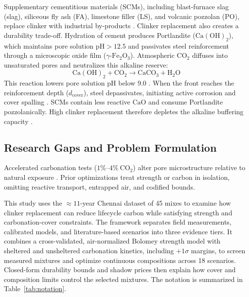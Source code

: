 \documentclass[journal]{IEEEtran}
\begin{document}
Supplementary cementitious materials (SCMs), including blast-furnace slag (slag), siliceous fly ash (FA), limestone filler (LS), and volcanic pozzolan (PO), replace clinker with industrial by-products \cite{scrivener2018, lothenbach2011}. Clinker replacement also creates a durability trade-off. Hydration of cement produces Portlandite ($\mathrm{Ca(OH)}_2$), which maintains pore solution $\mathrm{pH} > 12.5$ and passivates steel reinforcement through a microscopic oxide film ($\gamma\text{-}\mathrm{Fe}_2\mathrm{O}_3$). Atmospheric $\mathrm{CO}_2$ diffuses into unsaturated pores and neutralizes this alkaline reserve:
\begin{equation}
\mathrm{Ca(OH)}_2 + \mathrm{CO}_2 \to \mathrm{CaCO}_3 + \mathrm{H}_2\mathrm{O}
\label{eq:carbonation_rxn}
\end{equation}
This reaction lowers pore solution pH below 9.0 \cite{papadakis1991}. When the front reaches the reinforcement depth ($d_{\mathrm{cover}}$), steel depassivates, initiating active corrosion and cover spalling \cite{fib34, fib2020}. SCMs contain less reactive $\mathrm{CaO}$ and consume Portlandite pozzolanically. High clinker replacement therefore depletes the alkaline buffering capacity \cite{papadakis1992}.

\subsection{Research Gaps and Problem Formulation}
Accelerated carbonation tests ($1\%\text{--}4\%\ \mathrm{CO}_2$) alter pore microstructure relative to natural exposure \cite{vu2019, hule2024}. Prior optimizations treat strength or carbon in isolation, omitting reactive transport, entrapped air, and codified bounds.

This study uses the $\approx 11$-year Chennai dataset of 45 mixes \cite{hule2024, hule2024mendeley} to examine how clinker replacement can reduce lifecycle carbon while satisfying strength and carbonation-cover constraints. The framework separates field measurements, calibrated models, and literature-based scenarios into three evidence tiers. It combines a cross-validated, air-normalized Bolomey strength model with sheltered and unsheltered carbonation kinetics, including $+1\sigma$ margins, to screen measured mixtures and optimize continuous compositions across 18 scenarios. Closed-form durability bounds and shadow prices then explain how cover and composition limits control the selected mixtures. The notation is summarized in Table~\ref{tab:notation}.
\end{document}
